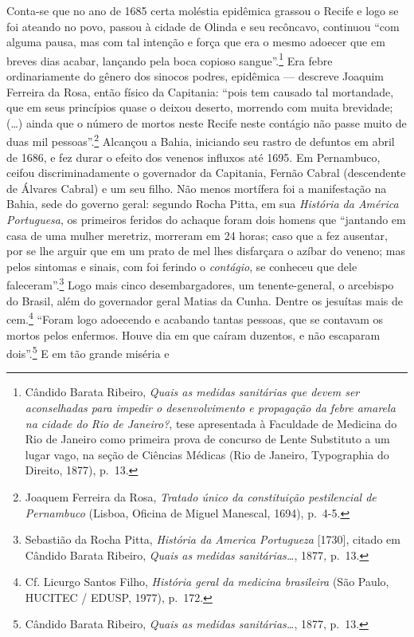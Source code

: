 Conta-se que no ano de 1685 certa moléstia epidêmica grassou o Recife e
logo se foi ateando no povo, passou à cidade de Olinda e seu recôncavo,
continuou ``com alguma pausa, mas com tal intenção e força que era o
mesmo adoecer que em breves dias acabar, lançando pela boca copioso
sangue''.\footnote{Cândido Barata Ribeiro, \textit{Quais as medidas
  sanitárias que devem ser aconselhadas para impedir o desenvolvimento e
  propagação da febre amarela na cidade do Rio de Janeiro?}, tese
  apresentada à Faculdade de Medicina do Rio de Janeiro como primeira
  prova de concurso de Lente Substituto a um lugar vago, na seção de
  Ciências Médicas (Rio de Janeiro, Typographia do Direito, 1877),
  p.~13.} Era febre ordinariamente do gênero dos sinocos podres,
epidêmica --- descreve Joaquim Ferreira da Rosa, então físico da
Capitania: ``pois tem causado tal mortandade, que em seus princípios
quase o deixou deserto, morrendo com muita brevidade; (\ldots{}) ainda
que o número de mortos neste Recife neste contágio não passe muito de
duas mil pessoas''.\footnote{Joaquem Ferreira da Rosa, \textit{Tratado
  único da constituição pestilencial de Pernambuco} (Lisboa, Oficina de
  Miguel Manescal, 1694), p.~4-5.} Alcançou a Bahia, iniciando seu
rastro de defuntos em abril de 1686, e fez durar o efeito dos venenos
influxos até 1695. Em Pernambuco, ceifou discriminadamente o governador
da Capitania, Fernão Cabral (descendente de Álvares Cabral) e um seu
filho. Não menos mortífera foi a manifestação na Bahia, sede do governo
geral: segundo Rocha Pitta, em sua \textit{História da América
Portuguesa}, os primeiros feridos do achaque foram dois homens que
``jantando em casa de uma mulher meretriz, morreram em 24 horas; caso
que a fez ausentar, por se lhe arguir que em um prato de mel lhes
disfarçara o azíbar do veneno; mas pelos sintomas e sinais, com foi
ferindo o \textit{contágio}, se conheceu que dele faleceram''.\footnote{Sebastião
  da Rocha Pitta, \textit{História da America Portugueza} {[}1730{]},
  citado em Cândido Barata Ribeiro, \textit{Quais as medidas
  sanitárias\ldots{}}, 1877\textit{,} p.~13.} Logo mais cinco
desembargadores, um tenente-general, o arcebispo do Brasil, além do
governador geral Matias da Cunha. Dentre os jesuítas mais de
cem.\footnote{Cf. Licurgo Santos Filho, \textit{História geral da medicina
  brasileira} (São Paulo, HUCITEC / EDUSP, 1977), p.~172.} ``Foram logo
adoecendo e acabando tantas pessoas, que se contavam os mortos pelos
enfermos. Houve dia em que caíram duzentos, e não escaparam
dois''.\footnote{Cândido Barata Ribeiro, \textit{Quais as medidas
  sanitárias\ldots{}}, 1877, p.~13.} E em tão grande miséria e
